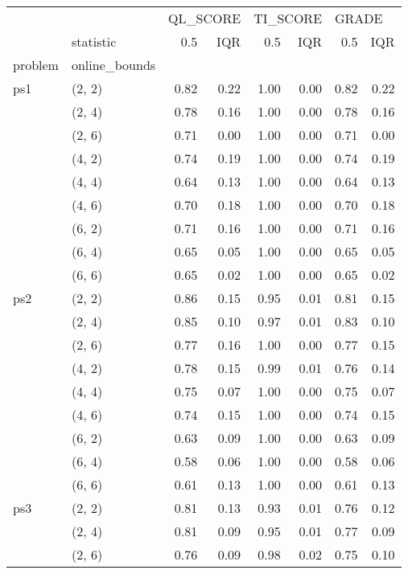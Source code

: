 \begin{tabular}{llrrrrrr}
\toprule
    & {} & \multicolumn{2}{l}{QL\_SCORE} & \multicolumn{2}{l}{TI\_SCORE} & \multicolumn{2}{l}{GRADE} \\
    & statistic &      0.5 &  IQR &      0.5 &  IQR &   0.5 &  IQR \\
problem & online\_bounds &          &      &          &      &       &      \\
\midrule
ps1 & (2, 2) &     0.82 & 0.22 &     1.00 & 0.00 &  0.82 & 0.22 \\
    & (2, 4) &     0.78 & 0.16 &     1.00 & 0.00 &  0.78 & 0.16 \\
    & (2, 6) &     0.71 & 0.00 &     1.00 & 0.00 &  0.71 & 0.00 \\
    & (4, 2) &     0.74 & 0.19 &     1.00 & 0.00 &  0.74 & 0.19 \\
    & (4, 4) &     0.64 & 0.13 &     1.00 & 0.00 &  0.64 & 0.13 \\
    & (4, 6) &     0.70 & 0.18 &     1.00 & 0.00 &  0.70 & 0.18 \\
    & (6, 2) &     0.71 & 0.16 &     1.00 & 0.00 &  0.71 & 0.16 \\
    & (6, 4) &     0.65 & 0.05 &     1.00 & 0.00 &  0.65 & 0.05 \\
    & (6, 6) &     0.65 & 0.02 &     1.00 & 0.00 &  0.65 & 0.02 \\
ps2 & (2, 2) &     0.86 & 0.15 &     0.95 & 0.01 &  0.81 & 0.15 \\
    & (2, 4) &     0.85 & 0.10 &     0.97 & 0.01 &  0.83 & 0.10 \\
    & (2, 6) &     0.77 & 0.16 &     1.00 & 0.00 &  0.77 & 0.15 \\
    & (4, 2) &     0.78 & 0.15 &     0.99 & 0.01 &  0.76 & 0.14 \\
    & (4, 4) &     0.75 & 0.07 &     1.00 & 0.00 &  0.75 & 0.07 \\
    & (4, 6) &     0.74 & 0.15 &     1.00 & 0.00 &  0.74 & 0.15 \\
    & (6, 2) &     0.63 & 0.09 &     1.00 & 0.00 &  0.63 & 0.09 \\
    & (6, 4) &     0.58 & 0.06 &     1.00 & 0.00 &  0.58 & 0.06 \\
    & (6, 6) &     0.61 & 0.13 &     1.00 & 0.00 &  0.61 & 0.13 \\
ps3 & (2, 2) &     0.81 & 0.13 &     0.93 & 0.01 &  0.76 & 0.12 \\
    & (2, 4) &     0.81 & 0.09 &     0.95 & 0.01 &  0.77 & 0.09 \\
    & (2, 6) &     0.76 & 0.09 &     0.98 & 0.02 &  0.75 & 0.10 \\

\end{tabular}
